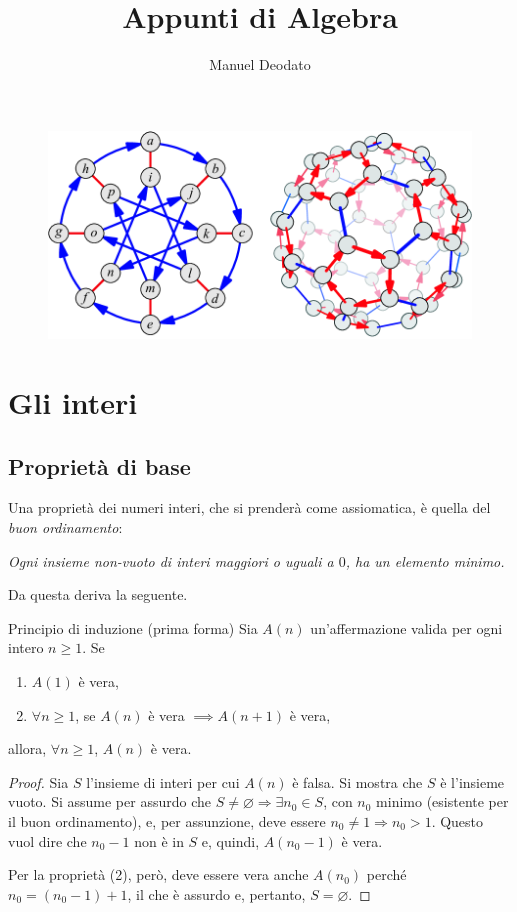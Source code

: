 \documentclass[11pt, a4paper]{scrartcl}
\title{Appunti di Algebra}
\author{Manuel Deodato}
\date{}
\theoremstyle{definition}
\numberwithin{esempio}{section}
\theoremstyle{definition}
\numberwithin{obs}{section}
\numberwithin{nota}{section}
\renewcommand{\maketitle}{
\begin{center}
{\sffamily
{\fontsize{20}{20}\selectfont\MakeUppercase\thetitle}}

\vspace{0.2in}

{\large\scshape\sffamily\theauthor}
\end{center}
}
\numberwithin{equation}{subsection}
\begin{document}
\maketitle
\vspace{10cm}
\begin{figure}[h!]
	\centering
	\includegraphics[width=.8\columnwidth]{front.png}
\end{figure}
\newpage
\tableofcontents 
\newpage
\section{Gli interi}
\subsection{Propriet\`a di base}
Una propriet\`a dei numeri interi, che si prender\`a come assiomatica, \`e quella del \textit{buon ordinamento}: 
\begin{center}
	\textit{Ogni insieme non-vuoto di interi maggiori o uguali a $0$, ha un elemento minimo.}
\end{center}
Da questa deriva la seguente.
\begin{teorema}
	{Principio di induzione (prima forma)}{}
	Sia $A(n)$ un'affermazione valida per ogni intero $n\ge 1$. Se
	\begin{enumerate}[(1).]
		\item $A(1)$ \`e vera,
		\item $\forall n \ge  1$, se $A(n)$ \`e vera $\implies A(n+1)$ \`e vera,
	\end{enumerate}
	allora, $\forall n \ge  1$, $A(n)$ \`e vera.
	\begin{proof}
		Sia $S $ l'insieme di interi per cui $A(n)$ \`e falsa. Si mostra che $S$ \`e l'insieme vuoto. 
		Si assume per assurdo che $S\neq \varnothing\Rightarrow \exists n_0 \in S$, con $n_0$ minimo (esistente per il buon ordinamento), e, per assunzione, deve essere $n_0 \neq 1 \Rightarrow  n_0>1$. 
		Questo vuol dire che $n_0 -1$ non \`e in $S$ e, quindi, $A(n_0-1)$ \`e vera.

		Per la propriet\`a (2), per\`o, deve essere vera anche $A(n_0)$ perch\'e $n_0 = (n_0-1) + 1$, il che \`e assurdo e, pertanto, $S = \varnothing$.
	\end{proof}
\end{teorema}
\end{document}
